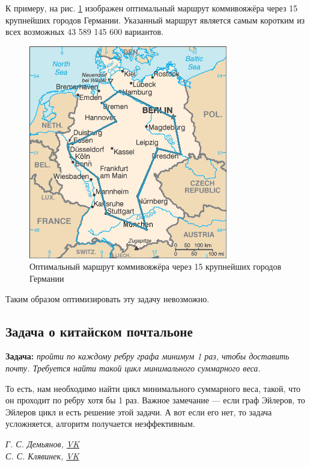 \documentclass[a4paper,12pt]{article}
\theoremstyle{plain} %
\theoremstyle{definition} %
\theoremstyle{remark} %
\begin{document}
К примеру, на рис. \ref{ris1} изображен оптимальный маршрут коммивояжёра через 15 крупнейших городов Германии. Указанный маршрут является самым коротким из всех возможных 43 589 145 600 вариантов.
\begin{figure}[h!]
	\centering
	\includegraphics[width=0.5\linewidth]{germany}
	\caption{Оптимальный маршрут коммивояжёра через 15 крупнейших городов Германии}
	\label{ris1}
\end{figure}

Таким образом оптимизировать эту задачу невозможно.

\subsection{Задача о китайском почтальоне}
\textbf{Задача:} \emph{пройти по каждому ребру графа минимум 1 раз, чтобы доставить почту. Требуется найти такой цикл минимального суммарного веса.}

То есть, нам необходимо найти цикл минимального суммарного веса, такой, что он проходит по ребру хотя бы 1 раз. Важное замечание --- если граф Эйлеров, то Эйлеров цикл и есть решение этой задачи. А вот если его нет, то задача усложняется, алгоритм получается неэффективным.










\begin{center}
	\vfill \emph{{\small Г. С. Демьянов, \href{https://vk.com/id37346992}{VK}\\
С. С. Клявинек, \href{https://vk.com/id85132547}{VK}
}}
\end{center}
\end{document}
